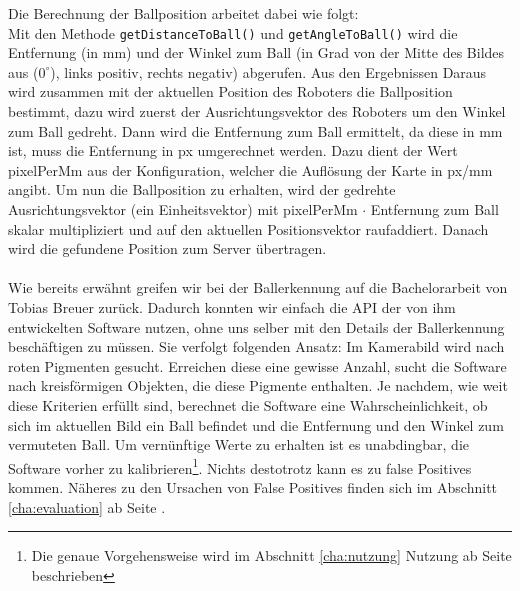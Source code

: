 Die Berechnung der Ballposition arbeitet dabei wie folgt:\\
 Mit den Methode \lstinline|getDistanceToBall()| und
    \lstinline|getAngleToBall()| wird die Entfernung (in mm) und der Winkel
    zum Ball (in Grad von der Mitte des Bildes aus ($0^\circ$), links positiv, rechts
		negativ) abgerufen. 
Aus den Ergebnissen Daraus wird zusammen mit der aktuellen Position des Roboters
    die Ballposition bestimmt, dazu wird zuerst der Ausrichtungsvektor des
		Roboters um den Winkel zum Ball gedreht.
Dann wird die Entfernung zum Ball ermittelt, da diese in mm ist, muss
die Entfernung in px umgerechnet werden. Dazu dient der Wert
pixelPerMm aus der Konfiguration, welcher die Auflösung der Karte in px/mm angibt. Um nun die Ballposition zu
		erhalten, wird der gedrehte Ausrichtungsvektor (ein Einheitsvektor) mit
		pixelPerMm $\cdot$ Entfernung zum Ball skalar multipliziert und auf den aktuellen
		Positionsvektor raufaddiert.
Danach wird die gefundene Position zum Server übertragen.
\\\\
Wie bereits erwähnt greifen wir bei der Ballerkennung auf die
Bachelorarbeit von Tobias Breuer zurück. Dadurch konnten wir einfach
die API der von ihm entwickelten Software nutzen, ohne uns selber mit
den Details der Ballerkennung beschäftigen zu müssen. Sie verfolgt
folgenden Ansatz: Im Kamerabild wird nach roten Pigmenten
gesucht. Erreichen diese eine gewisse Anzahl, sucht die Software nach
kreisförmigen Objekten, die diese Pigmente enthalten. Je nachdem,
wie weit diese Kriterien erfüllt sind, berechnet die Software eine
Wahrscheinlichkeit, ob sich im aktuellen Bild ein Ball befindet und
die Entfernung und den Winkel zum vermuteten Ball. Um vernünftige
Werte zu erhalten ist es unabdingbar, die Software vorher zu
kalibrieren\footnote{Die genaue Vorgehensweise wird im Abschnitt
\ref{cha:nutzung} Nutzung ab Seite \pageref{cha:nutzung} beschrieben}.  Nichts destotrotz kann es zu false Positives
kommen. Näheres zu den  Ursachen von
False Positives finden sich im Abschnitt \ref{cha:evaluation} ab Seite \pageref{cha:evaluation}.
